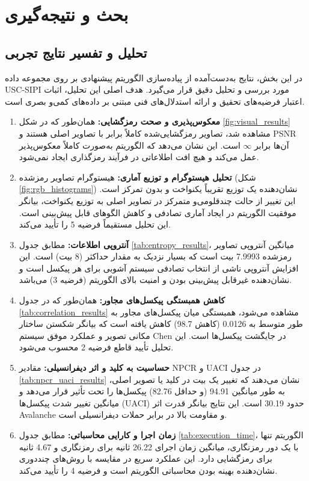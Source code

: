 \documentclass[a4paper,12pt]{report}
\renewcommand{\%}{\lr{\oldpercent}}
\providecommand{\lr}[1]{#1}
\begin{document}
\newpage

\chapter{بحث و نتیجه‌گیری}

\section{تحلیل و تفسیر نتایج تجربی}
در این بخش، نتایج به‌دست‌آمده از پیاده‌سازی الگوریتم پیشنهادی بر روی مجموعه داده \lr{USC-SIPI} مورد بررسی و تحلیل دقیق قرار می‌گیرد. هدف اصلی این تحلیل، اثبات اعتبار فرضیه‌های تحقیق و ارائه استدلال‌های فنی مبتنی بر داده‌های کمی‌و بصری است.

\begin{enumerate}
    \item \textbf{معکوس‌پذیری و صحت رمزگشایی:} همان‌طور که در شکل \ref{fig:visual_results} مشاهده شد، تصاویر رمزگشایی‌شده کاملاً برابر با تصاویر اصلی هستند و \lr{PSNR} آن‌ها برابر $\infty$ است. این نشان می‌دهد که الگوریتم به‌صورت کاملاً معکوس‌پذیر عمل می‌کند و هیچ افت اطلاعاتی در فرآیند رمزگذاری ایجاد نمی‌شود.
    \item \textbf{تحلیل هیستوگرام و توزیع آماری:} هیستوگرام تصاویر رمزشده (شکل \ref{fig:rgb_histograms}) نشان‌دهنده یک توزیع تقریباً یکنواخت و بدون تمرکز است. این تغییر از حالت چندقلومی‌و متمرکز در تصاویر اصلی به توزیع یکنواخت، بیانگر موفقیت الگوریتم در ایجاد آماری تصادفی و کاهش الگوهای قابل پیش‌بینی است. این تحلیل مستقیماً فرضیه 5 را تأیید می‌کند.
    \item \textbf{آنتروپی اطلاعات:} مطابق جدول \ref{tab:entropy_results}، میانگین آنتروپی تصاویر رمزشده 7.9993 بیت است که بسیار نزدیک به مقدار حداکثر (8 بیت) است. این افزایش آنتروپی ناشی از انتخاب تصادفی سیستم آشوبی برای هر پیکسل است و نشان‌دهنده غیرقابل پیش‌بینی بودن و امنیت بالای الگوریتم (فرضیه 3) می‌باشد.
    \item \textbf{کاهش همبستگی پیکسل‌های مجاور:} همان‌طور که در جدول \ref{tab:correlation_results} مشاهده می‌شود، همبستگی میان پیکسل‌های مجاور به طور متوسط به 0.0126 (کاهش \lr{98.7\%}) کاهش یافته است که بیانگر شکستن ساختار مکانی تصویر و عملکرد موفق سیستم \lr{Chen} در جایگشت پیکسل‌ها است. این تحلیل تأیید قاطع فرضیه 2 محسوب می‌شود.
    \item \textbf{حساسیت به کلید و اثر دیفرانسیلی:} مقادیر \lr{NPCR} و \lr{UACI} در جدول \ref{tab:npcr_uaci_results} نشان می‌دهند که تغییر یک بیت در کلید یا تصویر اصلی، به طور میانگین \lr{94.91\%} (و حداقل \lr{82.76\%}) پیکسل‌ها را تحت تأثیر قرار می‌دهد و میانگین تغییر شدت پیکسل‌ها (\lr{UACI}) حدود \lr{30.19\%} است. این نتایج بیانگر قدرت اثر \lr{Avalanche} و مقاومت بالا در برابر حملات دیفرانسیلی است.
    \item \textbf{زمان اجرا و کارایی محاسباتی:} مطابق جدول \ref{tab:execution_time}، الگوریتم تنها با یک دور رمزنگاری، میانگین زمان اجرای 26.22 ثانیه برای رمزنگاری و 4.67 ثانیه برای رمزگشایی دارد. این عملکرد سریع در مقایسه با روش‌های چنددوری نشان‌دهنده بهینه بودن محاسباتی الگوریتم است و فرضیه 4 را تأیید می‌کند.
\end{enumerate}
\end{document}
